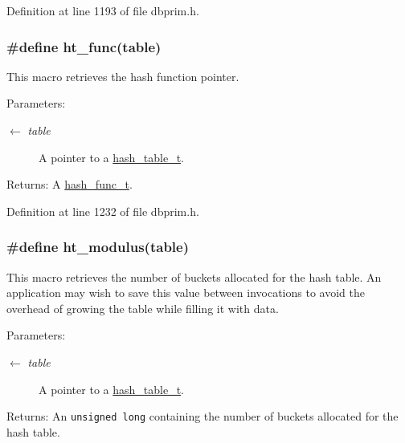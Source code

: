 Definition at line 1193 of file dbprim.h.\hypertarget{group__dbprim__hash_ga32}{
\subsubsection[ht\_\-func]{\setlength{\rightskip}{0pt plus 5cm}\#define ht\_\-func(table)}}
\label{group__dbprim__hash_ga32}


This macro retrieves the hash function pointer.

\begin{Desc}
\item[Parameters:]
\begin{description}
\item[\mbox{$\leftarrow$} {\em table}]A pointer to a \hyperlink{group__dbprim__hash_ga1}{hash\_\-table\_\-t}.\end{description}
\end{Desc}
\begin{Desc}
\item[Returns:]A \hyperlink{group__dbprim__hash_ga4}{hash\_\-func\_\-t}.\end{Desc}


Definition at line 1232 of file dbprim.h.\hypertarget{group__dbprim__hash_ga30}{
\subsubsection[ht\_\-modulus]{\setlength{\rightskip}{0pt plus 5cm}\#define ht\_\-modulus(table)}}
\label{group__dbprim__hash_ga30}


This macro retrieves the number of buckets allocated for the hash table. An application may wish to save this value between invocations to avoid the overhead of growing the table while filling it with data.

\begin{Desc}
\item[Parameters:]
\begin{description}
\item[\mbox{$\leftarrow$} {\em table}]A pointer to a \hyperlink{group__dbprim__hash_ga1}{hash\_\-table\_\-t}.\end{description}
\end{Desc}
\begin{Desc}
\item[Returns:]An {\tt unsigned long} containing the number of buckets allocated for the hash table.\end{Desc}


